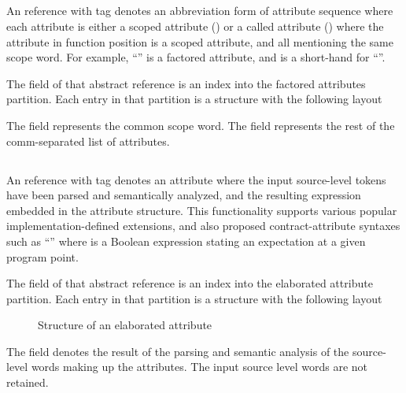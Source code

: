 
\subsection{}
\label{sec:ifc:AttrSort:Factored}

An  reference with tag  denotes an abbreviation form of attribute
sequence where each attribute is either a scoped attribute () 
or a called attribute () where the attribute in function position 
is a scoped attribute, and all mentioning the same scope word.  For example, 
``'' is a factored attribute, and is a short-hand for 
``''.

The  field of that abstract reference is an index into the factored attributes partition.
Each entry in that partition is a structure with the following layout
%
\begin{figure}[H]
    \centering
\end{figure}
%
The  field represents the common scope word.  The field  represents the 
rest of the comm-separated list of attributes.


\subsection{}
\label{sec:ifc:AttrSort:Elaborated}

An  reference with tag  denotes an attribute 
where the input source-level tokens have been parsed and semantically analyzed, and the resulting
expression embedded in the attribute structure.  This functionality supports various popular
implementation-defined extensions, and also proposed contract-attribute syntaxes such as
``'' where  is a Boolean expression stating an
expectation at a given program point.

The  field of that abstract reference is an index into the elaborated attribute partition.
Each entry in that partition is a structure with the following layout
%
\begin{figure}[H]
    \centering
    \caption{Structure of an elaborated attribute}
    \label{fig:ifc:AttrSort:Elaborated}
\end{figure}
%
The  field denotes the result of the parsing and semantic analysis of the 
source-level words making up the attributes.  The input source level words are not retained.

